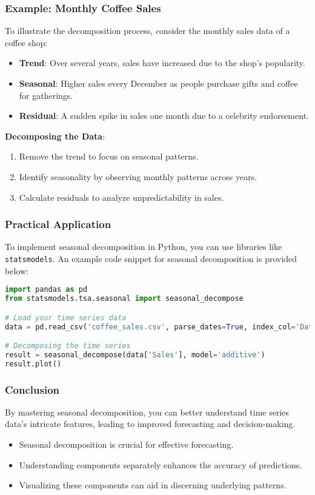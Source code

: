\documentclass[aspectratio=169]{beamer}
\begin{document}
\begin{frame}[fragile]
    \frametitle{Example: Monthly Coffee Sales}
    To illustrate the decomposition process, consider the monthly sales data of a coffee shop:
    
    \begin{itemize}
        \item \textbf{Trend}: Over several years, sales have increased due to the shop's popularity.
        \item \textbf{Seasonal}: Higher sales every December as people purchase gifts and coffee for gatherings.
        \item \textbf{Residual}: A sudden spike in sales one month due to a celebrity endorsement.
    \end{itemize}
    
    \textbf{Decomposing the Data}:
    \begin{enumerate}
        \item Remove the trend to focus on seasonal patterns.
        \item Identify seasonality by observing monthly patterns across years.
        \item Calculate residuals to analyze unpredictability in sales.
    \end{enumerate}
\end{frame}

\begin{frame}[fragile]
    \frametitle{Practical Application}
    To implement seasonal decomposition in Python, you can use libraries like \texttt{statsmodels}. An example code snippet for seasonal decomposition is provided below:
    
    \begin{lstlisting}[language=Python]
import pandas as pd
from statsmodels.tsa.seasonal import seasonal_decompose

# Load your time series data
data = pd.read_csv('coffee_sales.csv', parse_dates=True, index_col='Date')

# Decomposing the time series
result = seasonal_decompose(data['Sales'], model='additive')
result.plot()
    \end{lstlisting}
\end{frame}

\begin{frame}[fragile]
    \frametitle{Conclusion}
    By mastering seasonal decomposition, you can better understand time series data's intricate features, leading to improved forecasting and decision-making.

    \begin{itemize}
        \item Seasonal decomposition is crucial for effective forecasting.
        \item Understanding components separately enhances the accuracy of predictions.
        \item Visualizing these components can aid in discerning underlying patterns.
    \end{itemize}
\end{frame}
\end{document}
